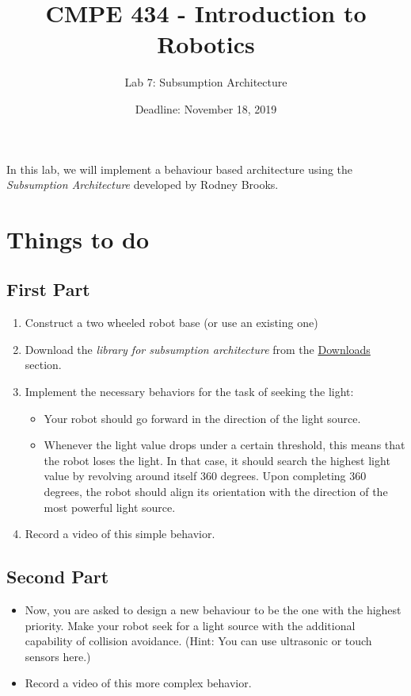 \documentclass{scrartcl}
\title{CMPE 434 - Introduction to Robotics}
\subtitle{Lab 7: Subsumption Architecture}
\date{Deadline: November 18, 2019}
\begin{document}
\maketitle

In this lab, we will implement a behaviour based architecture using the \emph{Subsumption Architecture} developed by Rodney Brooks.

\section{Things to do}

\subsection{First Part}
\begin{enumerate}
    \def\labelenumi{\arabic{enumi}.}
    \item Construct a two wheeled robot base (or use an existing one)
    \item Download the \textit{library for subsumption architecture} from the \href{http://robot.cmpe.boun.edu.tr/~cmpe434/doku.php?id=downloads#control}{Downloads} section.
    \item Implement the necessary behaviors for the task of seeking the light:
    
    \begin{itemize} 
        \item Your robot should go forward in the direction of the light source.
	    \item Whenever the light value drops under a certain threshold, this means that the robot loses the light. In that case, it should search the highest light value by revolving around itself 360 degrees. Upon completing 360 degrees, the robot should align its orientation with the direction of the most powerful light source.
    \end{itemize}
    \item  Record a video of this simple behavior.
\end{enumerate}

\subsection{Second Part}
\begin{itemize}
    \item Now, you are asked to design a new behaviour to be the one with the highest priority. Make your robot seek for a light source with the additional capability of collision avoidance. (Hint: You can use ultrasonic or touch sensors here.)
    \item  Record a video of this more complex behavior.
\end{itemize}
\end{document}
